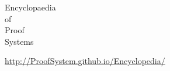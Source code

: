 


\begin{center}

\phantom{.}

\vspace{0pt}




{\fontsize{70}{90}\selectfont


Encyclopaedia\\
of\\
Proof\\ 
Systems\\
}

\vspace{120pt}

\begin{LARGE}
\url{http://ProofSystem.github.io/Encyclopedia/}
\end{LARGE}

\end{center}

